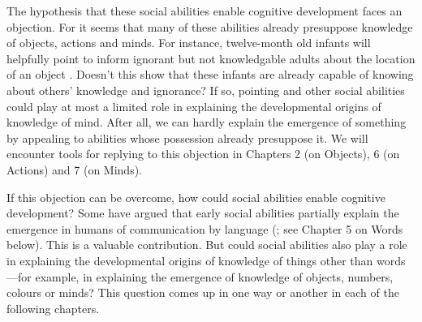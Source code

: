 \documentclass[12pt,\papersize]{extarticle}
\begin{document}
The hypothesis that these social abilities enable cognitive development faces an objection. 
For it seems that many of these abilities already presuppose  knowledge of objects, actions and minds. 
For instance, twelve-month old infants  will helpfully point to inform ignorant but not knowledgable adults about the location of an object  \citep{Liszkowski:2008al}.
Doesn't this show that these infants are already capable of knowing about others' knowledge and ignorance? 
If so, pointing and other social abilities could play at most a limited role in explaining the developmental origins of knowledge of mind. 
After all, we can hardly explain the emergence of something by appealing to abilities whose possession already presuppose it.
We will encounter tools for replying to this objection in Chapters 2 (on Objects), 6 (on Actions) and 7 (on Minds).

If this objection can be overcome, how could social abilities enable cognitive development? 
Some have argued that early social abilities partially explain the emergence in humans of communication by language (\citealp{tomasello:2008origins}; see Chapter 5 on Words below). 
This is a valuable contribution.  
But could social abilities also play a role in explaining the developmental origins of knowledge of things other than words---for example, in explaining the emergence of knowledge of objects, numbers, colours or minds? 
This question comes up in one way or another in each of the following chapters.
\end{document}
